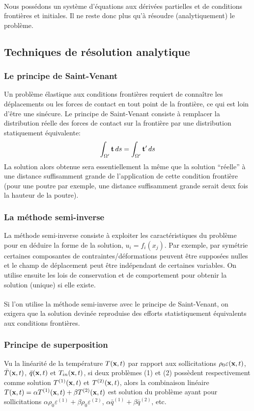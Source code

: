 \paragraph{}
Nous possédons un système d'équations aux dérivées partielles et de conditions frontières et initiales. Il ne reste donc plus qu'à résoudre (analytiquement) le problème.

\subsection{Techniques de résolution analytique}
\subsubsection*{Le principe de Saint-Venant}
Un problème élastique aux conditions frontières requiert de connaître les déplacements ou les forces de contact en tout point de la frontière, ce qui est loin d'être une sinécure. Le principe de Saint-Venant consiste à remplacer la distribution réelle des forces de contact sur la frontière par une distribution statiquement équivalente:
$$\int_{\Omega'}\textbf{t}\,ds=\int_{\Omega'}\textbf{t}'\,ds$$ La solution alors obtenue sera essentiellement la même que la solution ``réelle'' à une distance suffisamment grande de l'application de cette condition frontière (pour une poutre par exemple, une distance suffisamment grande serait deux fois la hauteur de la poutre).
\subsubsection*{La méthode semi-inverse}
La méthode semi-inverse consiste à exploiter les caractéristiques du problème pour en déduire la forme de la solution, $u_i=f_i(x_j)$. Par exemple, par symétrie certaines composantes de contraintes/déformations peuvent être supposées nulles et le champ de déplacement peut être indépendant de certaines variables. On utilise ensuite les lois de conservation et de comportement pour obtenir la solution (unique) si elle existe.
\paragraph{}
Si l'on utilise la méthode semi-inverse avec le principe de Saint-Venant, on exigera que la solution devinée reproduise des efforts statistiquement équivalents aux conditions frontières.
\subsubsection*{Principe de superposition}
Vu la linéarité de la température $T(\textbf{x},t)$ par rapport aux sollicitations $\rho_0\varepsilon(\textbf{x},t)$, $\bar{T}(\textbf{x},t)$, $\bar{q}(\textbf{x},t)$ et $T_{in}(\textbf{x},t)$, si deux problèmes (1) et (2) possèdent respectivement comme solution $T^{(1)}(\textbf{x},t)$ et $T^{(2)}(\textbf{x},t)$, alors la combinaison linéaire $T(\textbf{x},t)=\alpha T^{(1)}(\textbf{x},t)+\beta T^{(2)}(\textbf{x},t)$ est solution du problème ayant pour sollicitations $\alpha\rho_0\varepsilon^{(1)}+\beta\rho_0\varepsilon^{(2)}$, $\alpha\bar{q}^{(1)}+\beta\bar{q}^{(2)}$, etc.
